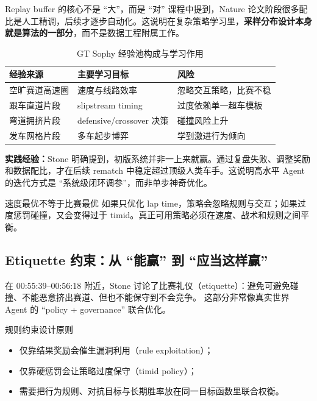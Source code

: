 \documentclass[a4paper]{article}
\begin{document}
\begin{knowledgebox}{Replay buffer 的核心不是 ``大''，而是 ``对''}
课程中提到，Nature 论文阶段很多配比是人工精调，后续才逐步自动化。这说明在复杂策略学习里，\textbf{采样分布设计本身就是算法的一部分}，而不是数据工程附属工作。
\end{knowledgebox}

\begin{table}[H]
\centering
\begin{tabular}{p{2.8cm}p{4.6cm}p{4.2cm}}
\toprule
\textbf{经验来源} & \textbf{主要学习目标} & \textbf{风险} \\
\midrule
空旷赛道高速圈 & 速度与线路效率 & 忽略交互策略，比赛不稳 \\
跟车直道片段 & slipstream timing & 过度依赖单一超车模板 \\
弯道拥挤片段 & defensive/crossover 决策 & 碰撞风险上升 \\
发车网格片段 & 多车起步博弈 & 学到激进行为倾向 \\
\bottomrule
\end{tabular}
\caption{GT Sophy 经验池构成与学习作用}
\end{table}

\textbf{实践经验：}Stone 明确提到，初版系统并非一上来就赢。通过复盘失败、调整奖励和数据配比，才在后续 rematch 中稳定超过顶级人类车手。这说明高水平 Agent 的迭代方式是 ``系统级闭环调参''，而非单步神奇优化。

\begin{warningbox}{速度最优不等于比赛最优}
如果只优化 lap time，策略会忽略规则与交互；如果过度惩罚碰撞，又会变得过于 timid。真正可用策略必须在速度、战术和规则之间平衡。
\end{warningbox}

\subsection{Etiquette 约束：从 ``能赢'' 到 ``应当这样赢''}
在 00:55:39--00:56:18 附近，Stone 讨论了比赛礼仪（etiquette）：避免可避免碰撞、不能恶意挤出赛道、但也不能保守到不会竞争。
这部分非常像真实世界 Agent 的 ``policy + governance'' 联合优化。

\begin{importantbox}{规则约束设计原则}
\begin{itemize}
    \item 仅靠结果奖励会催生漏洞利用（rule exploitation）；
    \item 仅靠硬惩罚会让策略过度保守（timid policy）；
    \item 需要把行为规则、对抗目标与长期胜率放在同一目标函数里联合权衡。
\end{itemize}
\end{importantbox}
\end{document}
